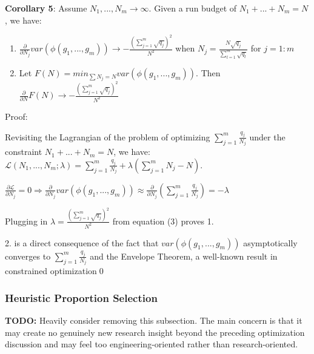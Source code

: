 \documentclass{article}
\begin{document}
\textbf{Corollary 5}: Assume $\displaystyle N_{1} ,...,N_{m}\rightarrow \infty $. Given a run budget of $\displaystyle N_{1} +...+N_{m} =N$, we have:
\begin{enumerate}
\item $\displaystyle \frac{\partial }{\partial N_{j}} var\left( \phi \left( g_{1} ,...,g_{m}\right)\right)\rightarrow -\frac{\left(\sum _{j=1}^{m}\sqrt{q_{j}}\right)^{2}}{N^{2}}$ when $\displaystyle N_{j} =\frac{N\sqrt{q_{j}}}{\sum _{l=1}^{m}\sqrt{q_{l}}}$ for $\displaystyle j=1:m$
\item Let $\displaystyle F\left( N\right) =min_{\sum N_{j} =N} var\left( \phi \left( g_{1} ,...,g_{m}\right)\right)$. Then $\displaystyle \frac{\partial }{\partial N} F\left( N\right)\rightarrow -\frac{\left(\sum _{j=1}^{m}\sqrt{q_{j}}\right)^{2}}{N^{2}}$
\end{enumerate}



Proof:

Revisiting the Lagrangian of the problem of optimizing $\displaystyle \sum _{j=1}^{m}\frac{q_{j}}{N_{j}}$ under the constraint $\displaystyle N_{1} +...+N_{m} =N$, we have: $\displaystyle \mathcal{L}\left( N_{1} ,...,N_{m} ;\lambda \right) =\sum _{j=1}^{m}\frac{q_{j}}{N_{j}} +\lambda \left(\sum _{j=1}^{m} N_{j} -N\right)$.

$\displaystyle \frac{\partial \mathcal{L}}{\partial N_{j}} =0\Longrightarrow \frac{\partial }{\partial N_{j}} var\left( \phi \left( g_{1} ,...,g_{m}\right)\right) \approx \frac{\partial }{\partial N_{j}}\left(\sum _{j=1}^{m}\frac{q_{j}}{N_{j}}\right) =-\lambda $

Plugging in $\displaystyle \lambda =\frac{\left(\sum _{j=1}^{m}\sqrt{q_{j}}\right)^{2}}{N^{2}}$ from equation (3) proves 1.



2. is a direct consequence of the fact that $\displaystyle var\left( \phi \left( g_{1} ,...,g_{m}\right)\right)$ asymptotically converges to $\displaystyle \sum _{j=1}^{m}\frac{q_{j}}{N_{j}}$ and the Envelope Theorem, a well-known result in constrained optimization\qed 



\subsubsection{Heuristic Proportion Selection}

\textbf{TODO:} Heavily consider removing this subsection. The main concern is that it may create no genuinely new research insight beyond the preceding optimization discussion and may feel too engineering-oriented rather than research-oriented.
\end{document}
